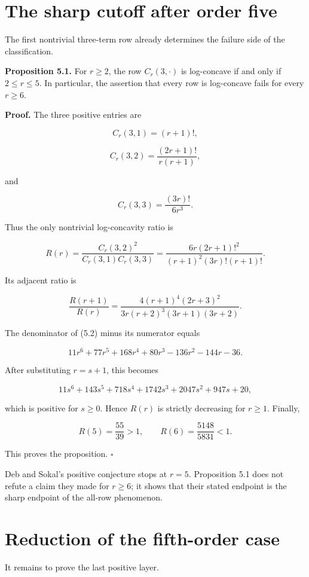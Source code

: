 \documentclass[11pt]{article}
\numberwithin{equation}{section}
\begin{document}
\section{The sharp cutoff after order five}


The first nontrivial three-term row already determines the failure side of the classification.

\textbf{Proposition 5.1.} For $r\ge2$, the row $C_r(3,\cdot)$ is log-concave if and only if
$2\le r\le5$. In particular, the assertion that every row is log-concave fails for every
$r\ge6$.

\textbf{Proof.} The three positive entries are

\[
C_r(3,1)=(r+1)!,
\]

\[
C_r(3,2)=\frac{(2r+1)!}{r(r+1)},
\]

and

\[
C_r(3,3)=\frac{(3r)!}{6r^3}.
\]

Thus the only nontrivial log-concavity ratio is

\[
R(r)=\frac{C_r(3,2)^2}{C_r(3,1)C_r(3,3)}
=\frac{6r(2r+1)!^2}{(r+1)^2(3r)!(r+1)!}.
\tag{5.1}
\]

Its adjacent ratio is

\[
\frac{R(r+1)}{R(r)}
=\frac{4(r+1)^4(2r+3)^2}{3r(r+2)^3(3r+1)(3r+2)}.
\tag{5.2}
\]

The denominator of (5.2) minus its numerator equals

\[
11r^6+77r^5+168r^4+80r^3-136r^2-144r-36.
\]

After substituting $r=s+1$, this becomes

\[
11s^6+143s^5+718s^4+1742s^3+2047s^2+947s+20,
\]

which is positive for $s\ge0$. Hence $R(r)$ is strictly decreasing for $r\ge1$. Finally,

\[
R(5)=\frac{55}{39}>1,
\qquad
R(6)=\frac{5148}{5831}<1.
\]

This proves the proposition. $\square$

Deb and Sokal's positive conjecture stops at $r=5$. Proposition 5.1 does not refute a
claim they made for $r\ge6$; it shows that their stated endpoint is the sharp endpoint of
the all-row phenomenon.

\section{Reduction of the fifth-order case}


It remains to prove the last positive layer.
\end{document}
